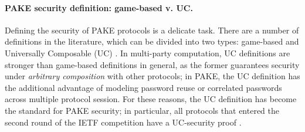 \paragraph{PAKE security definition: game-based v. UC.}
Defining the security of PAKE protocols is a delicate task. There are a number of definitions in the literature, which can be divided into two types: game-based \cite{EC:BelPoiRog00,PKC:AbdFouPoi05} and Universally Composable (UC) \cite{EC:CHKLM05,C:ABBJKX20}. In multi-party computation, UC definitions are stronger than game-based definitions in general, as the former guarantees security under \emph{arbitrary composition} with other protocols; in PAKE, the UC definition has the additional advantage of modeling password reuse or correlated passwords across multiple protocol session. For these reasons, the UC definition has become the standard for PAKE security; in particular, all protocols that entered the second round of the IETF competition have a UC-security proof \cite{...}.

